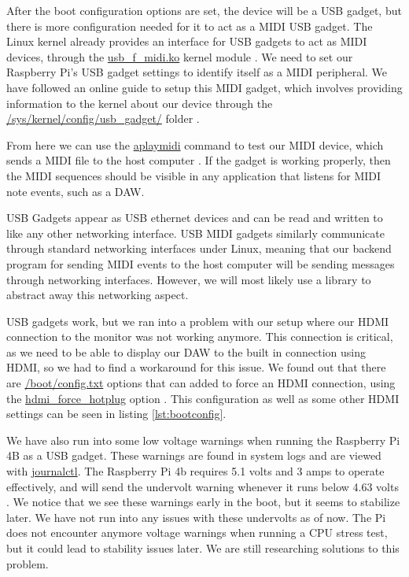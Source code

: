 After the boot configuration options are set, the device will be a USB gadget, but there
is more configuration needed for it to act as a MIDI USB gadget. The Linux kernel already
provides an interface for USB gadgets to act as MIDI devices, through the
\url{usb_f_midi.ko} kernel module \autocite{usbGadgetDocumentation}. We need to set our
Raspberry Pi's USB gadget settings to identify itself as a MIDI peripheral. We have
followed an online guide to setup this MIDI gadget, which involves providing information
to the kernel about our device through the \url{/sys/kernel/config/usb_gadget/} folder
\autocite{raspberryPiGadgetSetup}.

From here we can use the \url{aplaymidi} command to test our MIDI device, which sends a
MIDI file to the host computer \autocite{gadgetTesting}. If the gadget is working
properly, then the MIDI sequences should be visible in any application that listens for
MIDI note events, such as a DAW.

USB Gadgets appear as USB ethernet devices and can be read and written to like any other
networking interface. USB MIDI gadgets similarly communicate through standard networking
interfaces under Linux, meaning that our backend program for sending MIDI events to the
host computer will be sending messages through networking interfaces. However, we will
most likely use a library to abstract away this networking aspect.

USB gadgets work, but we ran into a problem with our setup where our HDMI connection to
the monitor was not working anymore. This connection is critical, as we need to be able to
display our DAW to the built in connection using HDMI, so we had to find a workaround for
this issue. We found out that there are \url{/boot/config.txt} options that can added to
force an HDMI connection, using the \url{hdmi_force_hotplug} option
\autocite{raspberryPiHDMIFix}. This configuration as well as some other HDMI settings can
be seen in listing \ref{lst:bootconfig}.

We have also run into some low voltage warnings when running the Raspberry Pi 4B as a USB
gadget. These warnings are found in system logs and are viewed with \url{journalctl}. The
Raspberry Pi 4b requires 5.1 volts and 3 amps to operate effectively, and will send the
undervolt warning whenever it runs below 4.63 volts \autocite{raspberryPiAmps}. We notice
that we see these warnings early in the boot, but it seems to stabilize later. We have not
run into any issues with these undervolts as of now. The Pi does not encounter anymore
voltage warnings when running a CPU stress test, but it could lead to stability issues
later.  We are still researching  solutions to this problem.


